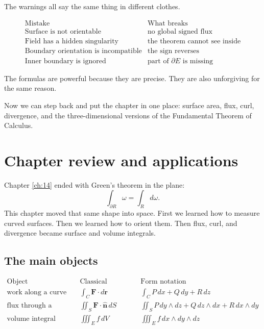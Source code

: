 The warnings all say the same thing in different clothes.

\[
\begin{array}{c|c}
\text{Mistake} & \text{What breaks} \\ \hline
\text{Surface is not orientable} & \text{no global signed flux}\\[1mm]
\text{Field has a hidden singularity} & \text{the theorem cannot see inside}\\[1mm]
\text{Boundary orientation is incompatible} & \text{the sign reverses}\\[1mm]
\text{Inner boundary is ignored} & \text{part of }\partial E\text{ is missing}
\end{array}
\]

The formulas are powerful because they are precise.  They are also unforgiving for the
same reason.

Now we can step back and put the chapter in one place: surface area, flux, curl,
divergence, and the three-dimensional versions of the Fundamental Theorem of
Calculus.

\section{Chapter review and applications}
\label{sec:15.9}

Chapter \ref{ch:14} ended with Green's theorem in the plane:
\[
    \int_{\partial R}\omega=\int_R d\omega.
\]
This chapter moved that same shape into space.  First we learned how to measure
curved surfaces.  Then we learned how to orient them.  Then flux, curl, and divergence
became surface and volume integrals.

\subsection{The main objects}

\[
\begin{array}{c|c|c}
\text{Object} & \text{Classical notation} & \text{Form notation} \\ \hline
\text{work along a curve} &
\displaystyle \int_C \mathbf F\cdot d\mathbf r &
\displaystyle \int_C P\,dx+Q\,dy+R\,dz
\\[3mm]
\text{flux through a surface} &
\displaystyle \iint_S \mathbf F\cdot\widehat{\mathbf n}\,dS &
\displaystyle \iint_S
P\,dy\wedge dz+Q\,dz\wedge dx+R\,dx\wedge dy
\\[3mm]
\text{volume integral} &
\displaystyle \iiint_E f\,dV &
\displaystyle \iiint_E f\,dx\wedge dy\wedge dz
\end{array}
\]

